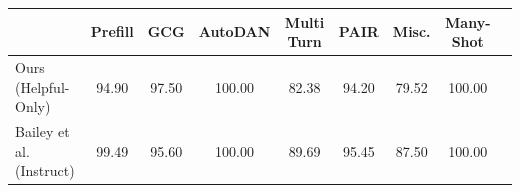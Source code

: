 \begin{tabular}{lcccccccc}
    \toprule
            & Prefill & GCG & AutoDAN & Multi Turn & PAIR & Misc. & Many-Shot \\
    \midrule
Ours (Helpful-Only) & 94.90 & 97.50 & 100.00 & 82.38 & 94.20 & 79.52 & 100.00 \\
Bailey et al. (Instruct) & 99.49 & 95.60 & 100.00 & 89.69 & 95.45 & 87.50 & 100.00 \\
    \bottomrule
\end{tabular}